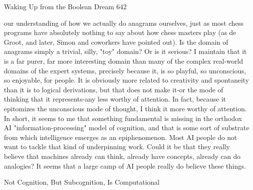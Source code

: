 Waking Up from the Boolean Dream                                                      642

our understanding of how we actually do anagrams ourselves, just as most chess
programs have absolutely nothing to say about how chess masters play (as de Groot,
and later, Simon and coworkers have pointed out).
         Is the domain of anagrams simply a trivial, silly, "toy" domain? Or is it
serious? I maintain that it is a far purer, far more interesting domain than many of the
complex real-world domains of the expert systems, precisely because it, is so playful,
so unconscious, so enjoyable, for people. It is obviously more related to creativity and
spontaneity than it is to logical derivations, but that does not make it-or the mode of
thinking that it represents-any less worthy of attention. In fact, because it epitomizes
the unconscious mode of thought, I think it more worthy of attention.
         In short, it seems to me that something fundamental is missing in the orthodox
AI "information-processing" model of cognition, and that is some sort of substrate
from which intelligence emerges as an epiphenomenon. Most AI people do not want
to tackle that kind of underpinning work. Could it be that they really believe that
machines already can think, already have concepts, already can do analogies? It seems
that a large camp of AI people really do believe these things.

                Not Cognition, But Subcognition, Is Computational

